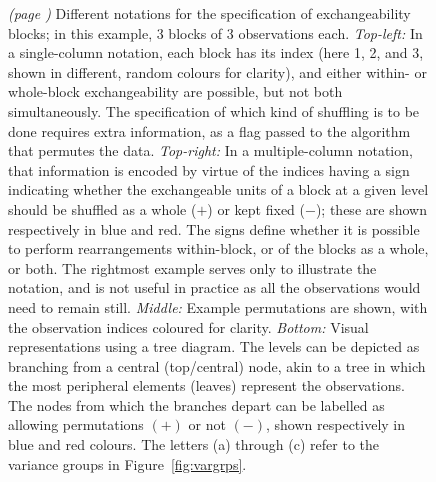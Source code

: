 \begin{figure}[!b]
\centering
\caption[Notations for the specification of exchangeability blocks.]{\emph{(page \pageref{fig:notation_noref})} Different notations for the specification of exchangeability blocks; in this example, 3 blocks of 3 observations each.
\emph{Top-left:} In a single-column notation, each block has its index (here 1, 2, and 3, shown in different, random colours for clarity), and either within- or whole-block exchangeability are possible, but not both simultaneously. The specification of which kind of shuffling is to be done requires extra information, as a flag passed to the algorithm that permutes the data.
\emph{Top-right:} In a multiple-column notation, that information is encoded by virtue of the indices having a sign indicating whether the exchangeable units of a block at a given level should be shuffled as a whole ($+$) or kept fixed ($-$); these are shown respectively in blue and red. The signs define whether it is possible to perform rearrangements within-block, or of the blocks as a whole, or both. The rightmost example serves only to illustrate the notation, and is not useful in practice as all the observations would need to remain still.
\emph{Middle:} Example permutations are shown, with the observation indices coloured for clarity.
\emph{Bottom:} Visual representations using a tree diagram. The levels can be depicted as branching from a central (top/central) node, akin to a tree in which the most peripheral elements (leaves) represent the observations. The nodes from which the branches depart can be labelled as allowing permutations $(+)$ or not $(-)$, shown respectively in blue and red colours. The letters (a) through (c) refer to the variance groups in Figure~\ref{fig:vargrps}.}
\label{fig:notation}
\end{figure}

